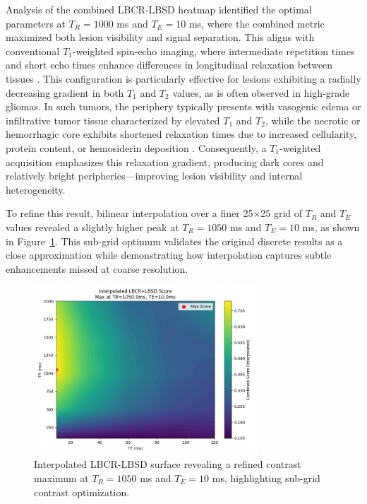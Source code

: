 \documentclass[10pt,a4paper,twoside]{article}
\begin{document}
Analysis of the combined LBCR-LBSD heatmap identified the optimal parameters at $T_R = 1000$ ms and $T_E = 10$ ms, where the combined metric maximized both lesion visibility and signal separation. This aligns with conventional $T_1$-weighted spin-echo imaging, where intermediate repetition times and short echo times enhance differences in longitudinal relaxation between tissues \cite{skalski2013}. This configuration is particularly effective for lesions exhibiting a radially decreasing gradient in both $T_1$ and $T_2$ values, as is often observed in high-grade gliomas. In such tumors, the periphery typically presents with vasogenic edema or infiltrative tumor tissue characterized by elevated $T_1$ and $T_2$, while the necrotic or hemorrhagic core exhibits shortened relaxation times due to increased cellularity, protein content, or hemosiderin deposition \cite{englund1986,blystad2017}. Consequently, a $T_1$-weighted acquisition emphasizes this relaxation gradient, producing dark cores and relatively bright peripheries—improving lesion visibility and internal heterogeneity.

To refine this result, bilinear interpolation over a finer 25×25 grid of $T_R$ and $T_E$ values revealed a slightly higher peak at $T_R = 1050$ ms and $T_E = 10$ ms, as shown in Figure~\ref{fig:lbcrlbsbinterpolated}. This sub-grid optimum validates the original discrete results as a close approximation while demonstrating how interpolation captures subtle enhancements missed at coarse resolution.

\begin{figure}[htbp!]
\centering
\includegraphics[width=0.75\textwidth]{lbcrlbsdinterpolatedheatmap.png}
\caption{Interpolated LBCR-LBSD surface revealing a refined contrast maximum at $T_R = 1050$ ms and $T_E = 10$ ms, highlighting sub-grid contrast optimization.}
\label{fig:lbcrlbsbinterpolated}
\end{figure}
\end{document}
